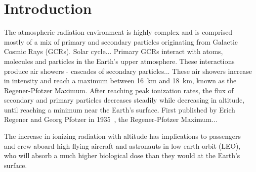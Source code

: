 \section{Introduction}
\label{Introduction}
The atmospheric radiation environment is highly complex and is comprised mostly of a mix of primary and secondary particles originating from Galactic Cosmic Rays (GCRs). 
Solar cycle...
Primary GCRs interact with atoms, molecules and particles in the Earth's upper atmosphere.  These interactions produce air showers - cascades of secondary particles...
These air showers increase in intensity and reach a maximum between \SI{16}{\km} and \SI{18}{\km}, known as the Regener-Pfotzer Maximum\cite{regener}.
After reaching peak ionization rates, the flux of secondary and primary particles decreases steadily while decreasing in altitude, until reaching a minimum near the Earth's surface. 
%
First published by Erich Regener and Georg Pfotzer in 1935~\cite{regener}, the Regener-Pfotzer Maximum...
%
%

The increase in ionizing radiation with altitude has implications to passengers and crew aboard high flying aircraft and astronauts in low earth orbit (LEO), who will absorb a much higher biological dose than they would at the Earth's surface. 

